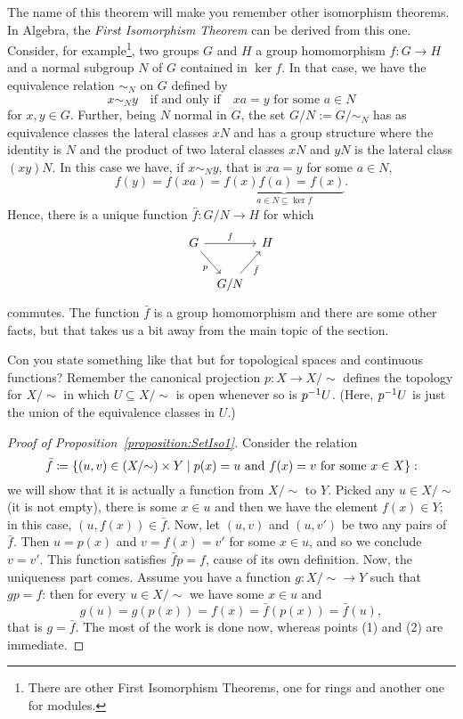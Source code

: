 The name of this theorem will make you remember other isomorphism theorems. In Algebra, the {\em First Isomorphism Theorem} can be derived from this one. Consider, for example\footnote{There are other First Isomorphism Theorems, one for rings and another one for modules.}, two groups \(G\) and \(H\) a group homomorphism \(f : G \to H\) and a normal subgroup \(N\) of \(G\) contained in \(\ker f\). In that case, we have the equivalence relation \(\sim_N\) on \(G\) defined by
\[x \sim_N y \quad \text{if and only if} \quad xa = y \text{ for some } a \in N\]
for \(x, y \in G\). Further, being \(N\) normal in \(G\), the set \(G/N := G{/}{\sim_N}\) has as equivalence classes the lateral classes \(xN\) and has a group structure where the identity is \(N\) and the product of two lateral classes \(xN\) and \(yN\) is the lateral class \((xy) N\). In this case we have, if \(x \sim_N y\), that is \(xa = y\) for some \(a \in N\),
\[f(y) = f(xa) = \underbrace{f(x) f(a) = f(x)}_{a \in N \subseteq \ker f} .\]
Hence, there is a unique function \(\bar f : G/N \to H\) for which
\[\begin{tikzcd}[column sep=tiny]
G \ar["f", rr] \ar["p", dr, swap] & & H \\
& G/N \ar["{\bar f}", ur, swap]
\end{tikzcd}\]
commutes. The function \(\bar f\) is a group homomorphism and there are some other facts, but that takes us a bit away from the main topic of the section.

\begin{exercise}
Con you state something like that but for topological spaces and continuous functions? Remember the canonical projection \(p : X \to X{/}{\sim}\) defines the topology for \(X{/}{\sim}\) in which \(U \subseteq X{/}{\sim}\) is open whenever so is \(p^{-1} U\). (Here, \(p^{-1} U\) is just the union of the equivalence classes in \(U\).)
\end{exercise}

\begin{proof}[Proof of Proposition~\ref{proposition:SetIso1}]
Consider the relation
\[\bar f \coloneq \left\{(u, v) \in (X{/}{\sim}) \times Y \mid p(x) = u \text{ and } f(x) = v \text{ for some } x \in X\right\} :\]
we will show that it is actually a function from \(X{/}{\sim}\) to \(Y\). Picked any \(u \in X{/}{\sim}\) (it is not empty), there is some \(x \in u\) and then we have the element \(f(x) \in Y\); in this case, \((u, f(x)) \in \bar f\). Now, let \((u, v)\) and \((u, v')\) be two any pairs of \(\bar f\). Then \(u = p(x)\) and \(v = f(x) = v'\) for some \(x \in u\), and so we conclude \(v = v'\). This function satisfies \(\bar f p = f\), cause of its own definition.\newline
Now, the uniqueness part comes. Assume you have a function \(g : X{/}{\sim} \to Y\) such that \(gp = f\): then for every \(u \in X{/}{\sim}\) we have some \(x \in u\) and
\[g(u) = g(p(x)) = f(x) = \bar f (p(x)) = \bar f(u) ,\]
that is \(g = \bar f\). The most of the work is done now, whereas points (1) and (2) are immediate.
\end{proof}

